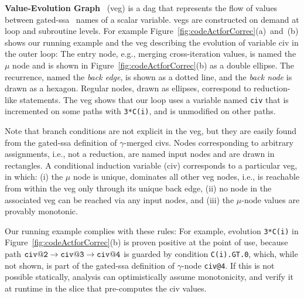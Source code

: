 \documentclass{sig-alternate}
\begin{document}
{\bf Value-Evolution Graph}~\cite{VEG} ({\sc veg}) is a {\sc dag}  %
that represents the flow of values between gated-{\sc ssa}~\cite{GatedSSA} names 
of a scalar variable.  
%
{\sc veg}s are constructed on demand at loop and subroutine levels.
For example Figure~\ref{fig:codeActforCorrec}(a)~and~(b) shows 
our running example and the {\sc veg} describing the evolution of
variable {\sc civ} in the outer loop: %
%
The entry node, e.g., merging cross-iteration values,  is named 
the $\mu$ node and is shown in Figure~\ref{fig:codeActforCorrec}(b) 
as a double ellipse. The recurrence, named the {\em back edge}, 
is shown as a dotted line, and the {\em back node} is drawn as a hexagon.
%
Regular nodes, drawn as ellipses, correspond to reduction-like 
statements. The {\sc veg} shows that our loop %
uses a variable named {\tt civ} that is incremented on some %
paths with {\tt 3*C(i)}, and is unmodified on other paths. 

Note that branch conditions are not explicit in the {\sc veg}, 
but they are easily found from the gated-{\sc ssa} definition 
of $\gamma$-merged {\sc civ}s. %
%
Nodes corresponding to arbitrary assignments, i.e., not a reduction, 
are named input nodes and are drawn in rectangles. 
%
A conditional induction variable ({\sc civ}) corresponds to a
particular {\sc veg}, in which:
  (i) the $\mu$ node is unique, dominates all other {\sc veg} nodes,
            i.e., is reachable from within the {\sc veg} only through its
            unique back edge, %
%
 (ii) no node in the associated {\sc veg} can be reached via any input nodes, and 
%
(iii) the $\mu$-node values are provably monotonic.
            
Our running example complies with these rules:
For example, evolution {\tt 3*C(i)} in 
Figure~\ref{fig:codeActforCorrec}(b) is proven positive at the 
point of use, because path 
${\tt civ@2}\rightarrow{\tt civ@3}\rightarrow{\tt civ@4}$
is guarded by condition {\tt C(i).GT.0}, which, while not 
shown, is part of the gated-{\sc ssa} definition of $\gamma$-node {\tt civ@4}. 
If this is not possible statically, analysis can optimistically
assume monotonicity, and verify it at runtime in the slice 
that pre-computes the {\sc civ} values. 

\vspace{1ex}
\end{document}
